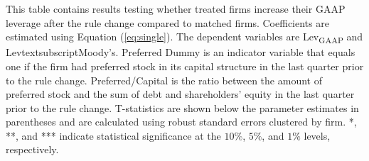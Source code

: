 \documentclass[a4paper, 12pt]{article}
\begin{document}
\begin{table}[htbp]
\caption{\textbf{The Effect of Rule Change on Leverage}
} \label{table_lev}
\begin{singlespace}
\begin{small}

\noindent This table contains results testing whether treated firms increase their GAAP leverage after the rule change compared to matched firms. Coefficients are estimated using Equation (\ref{eq:single}). The dependent variables are Lev\textsubscript{GAAP} and Levtextsubscript{Moody's}. Preferred Dummy is an indicator variable that equals one if the firm had preferred stock in its capital structure in the last quarter prior to the rule change. Preferred/Capital is the ratio between the amount of preferred stock and the sum of debt and shareholders' equity in the last quarter prior to the rule change. T-statistics are shown below the parameter estimates in parentheses and are calculated using robust standard errors clustered by firm. *, **, and *** indicate statistical significance at the $10\%$, $5\%$, and $1\%$ levels, respectively.

\end{small}
\end{singlespace}
\vspace{3mm}
\small
  \centering
\end{table}


\clearpage

\newpage
\end{document}
